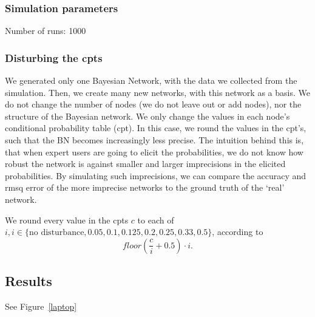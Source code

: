 \subsubsection{Simulation parameters}
Number of runs: 1000

\subsubsection{Disturbing the cpts}
We generated only one Bayesian Network, with the data we collected from the simulation. Then, we create many new networks, with this network as a basis. We do not change the number of nodes (we do not leave out or add nodes), nor the structure of the Bayesian network. We only change the values in each node's conditional probability table (cpt). In this case, we round the values in the cpt's, such that the BN becomes increasingly less precise. The intuition behind this is, that when expert users are going to elicit the probabilities, we do not know how robust the network is against smaller and larger imprecisions in the elicited probabilities. By simulating such imprecisions, we can compare the accuracy and rmsq error of the more imprecise networks to the ground truth of the `real' network. 

We round every value in the cpts $c$ to each of $i, i \in \{\text{no disturbance}, 0.05, 0.1, 0.125, 0.2, 0.25, 0.33, 0.5\}$, according to \[ floor(\frac{c}{i} + 0.5) \cdot i.\]



\subsection{Results}

See Figure~\ref{laptop}


